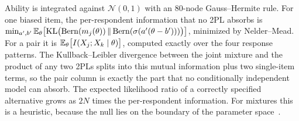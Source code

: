 Ability is integrated against $\mathcal N(0,1)$ with an 80-node Gauss--Hermite rule. For one biased
item, the per-respondent information that no 2PL absorbs is
$\min_{a',b'}\mathbb{E}_\theta\bigl[\mathrm{KL}\bigl(\mathrm{Bern}(m_j(\theta))\,\|\,\mathrm{Bern}(\sigma(a'(\theta-b')))\bigr)\bigr]$,
minimized by Nelder--Mead. For a pair it is
$\mathbb{E}_\theta\bigl[I(X_j;X_k\mid\theta)\bigr]$, computed exactly over the four response patterns.
The Kullback--Leibler divergence between the joint mixture and the product of any two 2PLs splits
into this mutual information plus two single-item terms, so the pair column is exactly the part
that no conditionally independent model can absorb. The expected likelihood ratio of a correctly
specified alternative grows as $2N$ times the per-respondent information. For mixtures this is a
heuristic, because the null lies on the boundary of the parameter space~\cite{self1987}.
